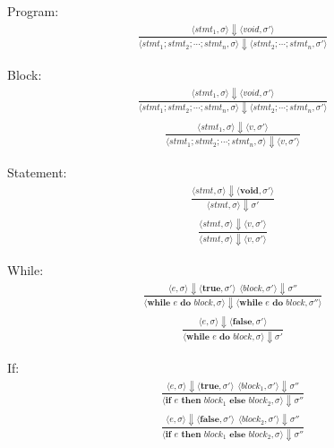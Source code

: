 \documentclass[12pt]{article}
\begin{document}
	Program:
	\begin{align*}
		\frac{\langle stmt_1, \sigma \rangle\Downarrow \langle void, \sigma' \rangle}
		{\langle stmt_1;stmt_2;\cdots;stmt_n, \sigma \rangle\Downarrow \langle stmt_2;\cdots;stmt_n, \sigma' \rangle}
	\end{align*}

	Block:
	\begin{align*}
		\frac{\langle stmt_1, \sigma \rangle\Downarrow \langle void, \sigma' \rangle}
		{\langle stmt_1;stmt_2;\cdots;stmt_n, \sigma \rangle\Downarrow \langle stmt_2;\cdots;stmt_n, \sigma' \rangle}
	\end{align*}
	\begin{align*}
		\frac{\langle stmt_1, \sigma \rangle\Downarrow \langle v, \sigma' \rangle}
		{\langle stmt_1;stmt_2;\cdots;stmt_n, \sigma \rangle\Downarrow \langle v, \sigma' \rangle}
	\end{align*}

	Statement:
	\begin{align*}
		\frac{\langle stmt, \sigma \rangle\Downarrow \langle \textbf{void}, \sigma' \rangle}
		{\langle stmt, \sigma \rangle\Downarrow \sigma'}
	\end{align*}
	\begin{align*}
		\frac{\langle stmt, \sigma \rangle\Downarrow \langle v, \sigma' \rangle}
		{\langle stmt, \sigma \rangle\Downarrow \langle v, \sigma' \rangle}
	\end{align*}

	
	While:
	\begin{align*}
		\frac{\langle e, \sigma \rangle\Downarrow \langle \textbf{true}, \sigma' \rangle \ \
		\langle block, \sigma' \rangle\Downarrow \sigma''}
		{\langle \textbf{while } e \textbf{ do } block, \sigma \rangle\Downarrow \langle \textbf{while } e \textbf{ do } block, \sigma'' \rangle}
	\end{align*}
	\begin{align*}
		\frac{\langle e, \sigma \rangle\Downarrow \langle \textbf{false}, \sigma' \rangle}
		{\langle \textbf{while } e \textbf{ do } block, \sigma \rangle\Downarrow \sigma'}
	\end{align*}

	If:
	\begin{align*}
		\frac{\langle e, \sigma \rangle\Downarrow \langle \textbf{true}, \sigma' \rangle \ \
		\langle block_1, \sigma' \rangle\Downarrow \sigma''}
		{\langle \textbf{if } e \textbf{ then } block_1 \textbf{ else } block_2, \sigma \rangle\Downarrow \sigma''}
	\end{align*}
	\begin{align*}
		\frac{\langle e, \sigma \rangle\Downarrow \langle \textbf{false}, \sigma' \rangle \ \
		\langle block_2, \sigma' \rangle\Downarrow \sigma''}
		{\langle \textbf{if } e \textbf{ then } block_1 \textbf{ else } block_2, \sigma \rangle\Downarrow \sigma''}
	\end{align*}
\end{document}
